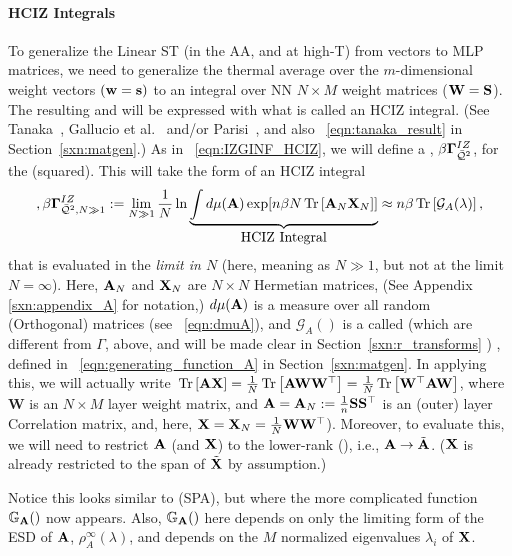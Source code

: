 \paragraph{HCIZ Integrals}
To generalize the Linear ST \Perceptron (in the AA, and at high-T) from \Perceptron vectors to MLP matrices,
we need to generalize the thermal average over the $m$-dimensional \Perceptron weight vectors $({\mathbf{w}}={\mathbf{s}})$
to an integral over NN \Student $N \times M$ weight matrices (${\mathbf{W}}=\mathbf{S}$).
The resulting \PartitionFunction and \FreeEnergy will be expressed with what is called an HCIZ integral.
(See Tanaka~\cite{Tanaka2007, Tanaka2008}, Gallucio et al.~\cite{Bouchaud1998} and/or Parisi~\cite{PP95}, and also \EQN~\ref{eqn:tanaka_result} in Section~\ref{sxn:matgen}.)
As in \EQN~\ref{eqn:IZGINF_HCIZ}, we will define a \emph{\LayerQuality \GeneratingFunction}, $\beta\mathbf{\Gamma}^{IZ}_{\bar{\mathcal{Q}}^{2}}$, for the \LayerQuality (squared).
This will take the form of an HCIZ integral
\begin{align}
\label{eqn:hciz_prelim},
\beta\mathbf{\Gamma}^{IZ}_{\bar{\mathcal{Q}}^{2},N\gg 1} := \lim_{N\gg 1}\frac{1}{N}\ln \underbrace{\int d\mu(\mathbf{A}) \exp[n\beta N\mbox{}\operatorname{Tr}\left[\mathbf{A}_N\mathbf{X}_N\right]] }_{\mbox{HCIZ Integral}} 
  \approx n\beta\mbox{}\operatorname{Tr}\left[\mathcal{G}_{A}(\lambda)\right]  ,
\end{align}
that is evaluated in the \WideLayer\emph{\LargeN limit in $N$} (here, meaning as $N \gg 1$, but not at the limit $N=\infty$).
Here,  $\mathbf{A}_N$ and $\mathbf{X}_N$ are $N \times N$ Hermetian matrices, (See Appendix \ref{sxn:appendix_A} for notation,) $d\mu(\mathbf{A})$ is a measure
over all random (Orthogonal) matrices (see \EQN~\ref{eqn:dmuA}),
and $\mathcal{G}_{A}()$ is a called  \GEN 
(which are different from $\Gamma$, above, and will be made clear in Section~\ref{sxn:r_transforms} ) , defined in \EQN~\ref{eqn:generating_function_A} in Section~\ref{sxn:matgen}. 
In applying this, we will actually write $\mbox{}\operatorname{Tr}\left[\mathbf{A}\mathbf{X}\right]=\tfrac{1}{N}\mbox{}\operatorname{Tr}\left[\mathbf{A}{\mathbf{W}}{\mathbf{W}}^{\top}\right]=\tfrac{1}{N}\mbox{}\operatorname{Tr}\left[{\mathbf{W}}^{\top}\mathbf{A}{\mathbf{W}}\right]$,
where $\mathbf{W}$ is an $N \times M$ layer weight matrix, and $\mathbf{A}=\mathbf{A}_N:=\tfrac{1}{n}{\mathbf{S}}{\mathbf{S}}^{\top}$ is an (outer) layer
Correlation matrix, and, here,  $\mathbf{X}=\mathbf{X}_N=\tfrac{1}{N}{\mathbf{W}}{\mathbf{W}}^{\top}$).
Moreover, to evaluate this, we will need to restrict $\mathbf{A}$ (and $\mathbf{X}$)
to the lower-rank \EffectiveCorrelationSpace (\ECS),  i.e., $\mathbf{A}\rightarrow\tilde{\mathbf{A}}$. ($\mathbf{X}$ is already restricted to the span of $\tilde{\mathbf{X}}$ by \ECS assumption.)

Notice this looks similar to \SaddlePointApproximation (SPA), but where the more complicated function
$\mathbb{G}_{\mathbf{A}}()$ now appears.
Also, $\mathbb{G}_{\mathbf{A}}()$ here depends on only the limiting form of the ESD of $\mathbf{A}$, $\rho^{\infty}_{A}(\lambda)$,
and depends on the $M$ normalized eigenvalues $\lambda_{i}$ of $\mathbf{X}$.


